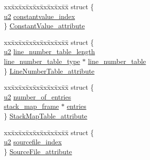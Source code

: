 \begin{DoxyCompactItemize}
\item 
\begin{tabbing}
xx\=xx\=xx\=xx\=xx\=xx\=xx\=xx\=xx\=\kill
struct \{\\
\>\hyperlink{structures_8h_a55ef8d87fd202b8417704c089899c5b9}{u2} \hyperlink{unionattribute__types_abec9c5f39e4bfdc4de221e4645d15754}{constantvalue\_index}\\
\} \hyperlink{unionattribute__types_aaecd67000fbd2536ca5290a26b0413b0}{ConstantValue\_attribute}\\

\end{tabbing}\item 
\begin{tabbing}
xx\=xx\=xx\=xx\=xx\=xx\=xx\=xx\=xx\=\kill
struct \{\\
\>\hyperlink{structures_8h_a55ef8d87fd202b8417704c089899c5b9}{u2} \hyperlink{unionattribute__types_acef55ed8e6d377038f26e56398715ba3}{line\_number\_table\_length}\\
\>\hyperlink{structline__number__table__type}{line\_number\_table\_type} $\ast$ \hyperlink{unionattribute__types_af9c522c40e319223069c2aa95863aef1}{line\_number\_table}\\
\} \hyperlink{unionattribute__types_ac8d1e9ca062ca40620b53e65d67b78fd}{LineNumberTable\_attribute}\\

\end{tabbing}\item 
\begin{tabbing}
xx\=xx\=xx\=xx\=xx\=xx\=xx\=xx\=xx\=\kill
struct \{\\
\>\hyperlink{structures_8h_a55ef8d87fd202b8417704c089899c5b9}{u2} \hyperlink{unionattribute__types_a27a78095d45ab77a8670fe3d9c7fd349}{number\_of\_entries}\\
\>\hyperlink{structstack__map__frame}{stack\_map\_frame} $\ast$ \hyperlink{unionattribute__types_ac00cec5af4c5a187ddd975ce5cb2bc46}{entries}\\
\} \hyperlink{unionattribute__types_af40b8d96b4ed7c185e3bbe69ce26d920}{StackMapTable\_attribute}\\

\end{tabbing}\item 
\begin{tabbing}
xx\=xx\=xx\=xx\=xx\=xx\=xx\=xx\=xx\=\kill
struct \{\\
\>\hyperlink{structures_8h_a55ef8d87fd202b8417704c089899c5b9}{u2} \hyperlink{unionattribute__types_a28b4309a74ee5b3ea7d6738538c7a0d1}{sourcefile\_index}\\
\} \hyperlink{unionattribute__types_a4c070f5b3468652a8d4face97c3fc4e8}{SourceFile\_attribute}\\


\end{tabbing}
\end{DoxyCompactItemize}
